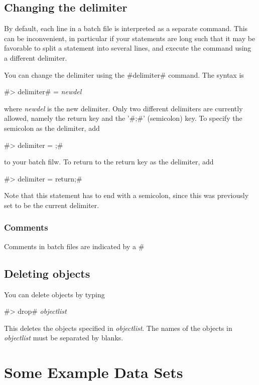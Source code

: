 \subsection{Changing the delimiter}
 \label{delimiter} 

By default, each line in a batch file is interpreted as a separate command. This can be inconvenient, in particular if your statements are long such that it may be favorable to split a
statement into several lines, and execute the command using a different delimiter. 

You can change the delimiter using the #delimiter# command. The syntax is

#> delimiter# = {\em newdel}

where {\em newdel} is the new delimiter. Only two different delimiters are currently allowed, namely the return key and the '#;#' (semicolon) key. To specify the semicolon as the delimiter, add

#> delimiter = ;#

to your batch filw. To return to the return key as the delimiter, add

#> delimiter = return;#

Note that this statement has to end with a semicolon, since this was previously set to be the current delimiter.

\subsubsection*{Comments}

Comments in batch files are indicated by a  #%

\subsection{Deleting objects}

You can delete objects by typing

#> drop# {\em objectlist}

This deletes the objects specified in {\em objectlist}. The names of the objects in {\em objectlist} must be separated by blanks.

\section{Some Example Data Sets}
 \label{datadescription} 

